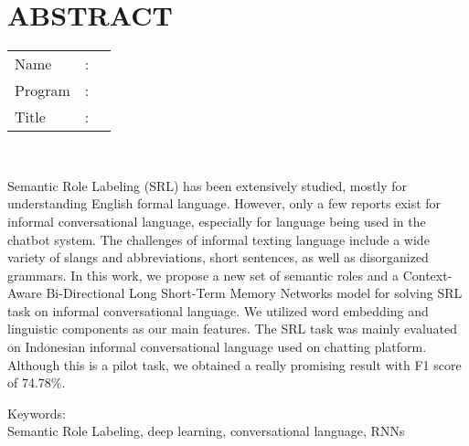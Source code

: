 %
%
%

\chapter*{ABSTRACT}

\vspace*{0.2cm}

\noindent \begin{tabular}{l l p{11.0cm}}
	Name&: & \penulis \\
	Program&: & \programEng \\
	Title&: & \judulInggris \\
\end{tabular} \\ 

\vspace*{0.5cm}

\noindent 

Semantic Role Labeling (SRL) has been extensively studied, mostly for understanding English formal language. However, only a few reports exist for informal conversational language, especially for language being used in the chatbot system. The challenges of informal texting language include a wide variety of slangs and abbreviations, short sentences, as well as disorganized grammars. In this work, we propose a new set of semantic roles and a Context-Aware Bi-Directional Long Short-Term Memory Networks model for solving SRL task on informal conversational language. We utilized word embedding and linguistic components as our main features. The SRL task was mainly evaluated on Indonesian informal conversational language used on chatting platform. Although this is a pilot task, we obtained a really promising result with F1 score of 74.78\%.


\vspace*{0.2cm}

\noindent Keywords: \\ 
\noindent Semantic Role Labeling, deep learning, conversational language, RNNs \\ 

\newpage